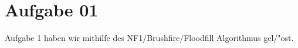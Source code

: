 \newpage
\section{Aufgabe 01}
Aufgabe 1 haben wir mithilfe des NF1/Brushfire/Floodfill Algorithmus gel/"ost.

